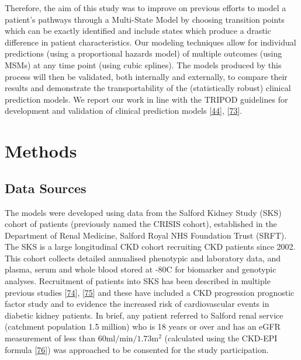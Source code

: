 \documentclass[12pt,PhD,twoside,openright]{muthesis}
\begin{document}
Therefore, the aim of this study was to improve on previous efforts to model a patient's pathways through a Multi-State Model by choosing transition points which can be exactly identified and include states which produce a drastic difference in patient characteristics. Our modeling techniques allow for individual predictions (using a proportional hazards model) of multiple outcomes (using MSMs) at any time point (using cubic splines). The models produced by this process will then be validated, both internally and externally, to compare their results and demonstrate the transportability of the (statistically robust) clinical prediction models. We report our work in line with the TRIPOD guidelines for development and validation of clinical prediction models {[}\protect\hyperlink{ref-collins_transparent_2015}{44}{]}, {[}\protect\hyperlink{ref-moons_transparent_2015}{73}{]}.

\hypertarget{methods-7}{%
\section{Methods}\label{methods-7}}

\hypertarget{data-sources}{%
\subsection{Data Sources}\label{data-sources}}

The models were developed using data from the Salford Kidney Study (SKS) cohort of patients (previously named the CRISIS cohort), established in the Department of Renal Medicine, Salford Royal NHS Foundation Trust (SRFT). The SKS is a large longitudinal CKD cohort recruiting CKD patients since 2002. This cohort collects detailed annualised phenotypic and laboratory data, and plasma, serum and whole blood stored at -80\textdegree C for biomarker and genotypic analyses. Recruitment of patients into SKS has been described in multiple previous studies {[}\protect\hyperlink{ref-hoefield_factors_2010}{74}{]}, {[}\protect\hyperlink{ref-chinnadurai_increased_2019-1}{75}{]} and these have included a CKD progression prognostic factor study and to evidence the increased risk of cardiovascular events in diabetic kidney patients. In brief, any patient referred to Salford renal service (catchment population 1.5 million) who is 18 years or over and has an eGFR measurement of less than \(60\textrm{ml}/\textrm{min}/1.73\textrm{m}^2\) (calculated using the CKD-EPI formula {[}\protect\hyperlink{ref-levey_new_2009}{76}{]}) was approached to be consented for the study participation.
\end{document}
